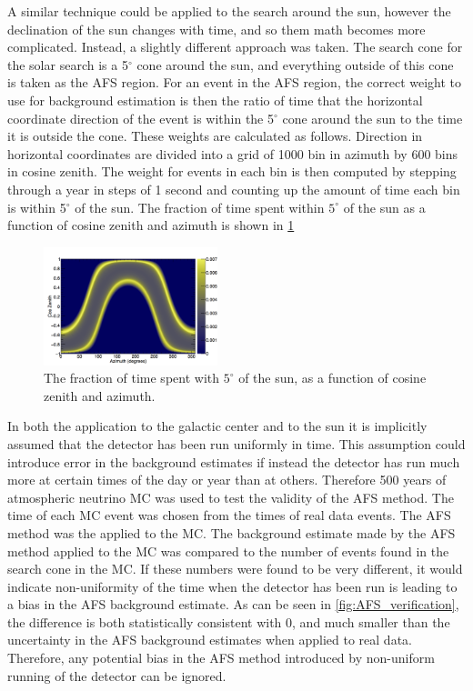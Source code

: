 A similar technique could be applied to the search around the sun, however the declination of the sun changes with time, and so them math becomes more complicated.  Instead, a slightly different approach was taken.  The search cone for the solar search is a 5$^\circ$ cone around the sun, and everything outside of this cone is taken as the AFS region.  For an event in the AFS region, the correct weight to use for background estimation is then the ratio of time that the horizontal coordinate direction of the event is within the 5$^\circ$ cone around the sun to the time it is outside the cone.  These weights are calculated as follows.  Direction in horizontal coordinates are divided into a grid of 1000 bin in azimuth by 600 bins in cosine zenith.  The weight for events in each bin is then computed by stepping through a year in steps of 1 second and counting up the amount of time each bin is within 5$^\circ$ of the sun.  The fraction of time spent within $5^\circ$ of the sun as a function of cosine zenith and azimuth is shown in \cref{fig:pos_sun}

\begin{figure}
\includegraphics[width=0.45\textwidth]{figures/pos_sun.png}
\caption{The fraction of time spent with $5^\circ$ of the sun, as a function of cosine zenith and azimuth.  }
\label{fig:pos_sun}
\end{figure}   

In both the application to the galactic center and to the sun it is implicitly assumed that the detector has been run uniformly in time.  This assumption could introduce error in the background estimates if instead the detector has run much more at certain times of the day or year than at others.  Therefore 500 years of atmospheric neutrino MC was used to test the validity of the AFS method.  The time of each MC event was chosen from the times of real data events.  The AFS method was the applied to the MC.  The background estimate made by the AFS method applied to the MC was compared to the number of events found in the search cone in the MC.  If these numbers were found to be very different, it would indicate non-uniformity of the time when the detector has been run is leading to a bias in the AFS background estimate.  As can be seen in \cref{fig:AFS_verification}, the difference is both statistically consistent with 0, and much smaller than the uncertainty in the AFS background estimates when applied to real data.  Therefore, any potential bias in the AFS method introduced by non-uniform running of the detector can be ignored.  


